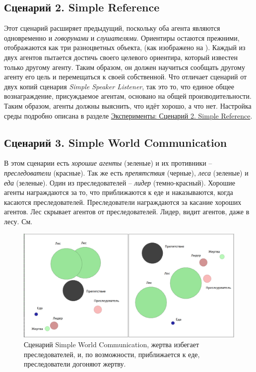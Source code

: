 \subsection{Сценарий 2. Simple Reference} \label{intro-sr}

Этот сценарий расширяет предыдущий, поскольку оба агента являются одновременно и \textit{говорунами} и \textit{слушателями}. Ориентиры остаются прежними, отображаются как три разноцветных объекта, (как изображено на ). Каждый из двух агентов пытается достичь своего целевого ориентира, который известен только другому агенту. Таким образом, он должен научиться сообщать другому агенту его цель и перемещаться к своей собственной. Что отличает сценарий от двух копий сценария \textit{Simple Speaker Listener}, так это то, что единое общее вознаграждение, присуждаемое агентам, основано на общей производительности. Таким образом, агенты должны выяснить, что идёт хорошо, а что нет. Настройка среды подробно описана в разделе \hyperref[exp-sr]{Эксперименты: Сценарий 2. Simple Reference}.

\subsection{Сценарий 3. Simple World Communication} \label{intro-swc}

В этом сценарии есть \textit{хорошие агенты} (зеленые) и их противники – \textit{преследователи} (красные). Так же есть \textit{препятствия} (черные), \textit{леса} (зеленые) и \textit{еда} (зеленые). Один из преследователей – \textit{лидер} (темно-красный).
Хорошие агенты награждаются за то, что приближаются к еде и наказываются, когда касаются преследователей.
Преследователи награждаются за касание хороших агентов.
Лес скрывает агентов от преследователей. Лидер, видит агентов, даже в лесу. См. 

\begin{figure}[ht!] 
	\center
	\includegraphics [scale=0.41] {my_folder/images/swc.png}
	\caption{Сценарий Simple World Communication, жертва избегает преследователей, и, по возможности, приближается к еде, преследователи догоняют жертву.}
	\label{fig:swc}  
\end{figure}

